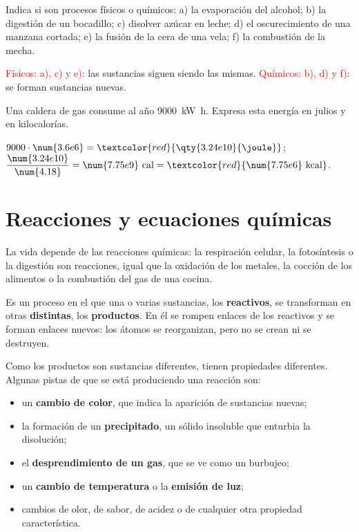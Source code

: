 \begin{exercise}
    Indica si son procesos físicos o químicos: a) la evaporación del alcohol; b) la digestión de un bocadillo; c) disolver azúcar
    en leche; d) el oscurecimiento de una manzana cortada; e) la fusión de la cera de una vela; f) la combustión de la mecha.
    \begin{solu}
        \textcolor{red}{Físicos: a), c) y e)}: las sustancias siguen siendo las mismas. \textcolor{red}{Químicos: b), d) y f)}: se
        forman sustancias nuevas.
    \end{solu}
\end{exercise}

\begin{exercise}
    Una caldera de gas consume al año \qty{9000}{\kilo\watt\hour}. Expresa esta energía en julios y en kilocalorías.
    \begin{solu}
        \(9000 \cdot \num{3.6e6} = \textcolor{red}{\qty{3.24e10}{\joule}}\); \(\dfrac{\num{3.24e10}}{\num{4.18}} = \num{7.75e9}~\mathrm{cal}
        = \textcolor{red}{\num{7.75e6}~\mathrm{kcal}}\).
    \end{solu}
\end{exercise}

\section{Reacciones y ecuaciones químicas}\label{sec:ud6-reacciones}

La vida depende de las reacciones químicas: la respiración celular, la fotosíntesis o la digestión son reacciones, igual que la
oxidación de los metales, la cocción de los alimentos o la combustión del gas de una cocina.

\begin{definition}
    Es un proceso en el que una o varias sustancias, los \textbf{reactivos}, se transforman en otras \textbf{distintas}, los
    \textbf{productos}. En él se rompen enlaces de los reactivos y se forman enlaces nuevos: los átomos se reorganizan, pero no se
    crean ni se destruyen.
\end{definition}

Como los productos son sustancias diferentes, tienen propiedades diferentes. Algunas pistas de que se está produciendo una
reacción son:
\begin{itemize}
    \item un \textbf{cambio de color}, que indica la aparición de sustancias nuevas;
    \item la formación de un \textbf{precipitado}, un sólido insoluble que enturbia la disolución;
    \item el \textbf{desprendimiento de un gas}, que se ve como un burbujeo;
    \item un \textbf{cambio de temperatura} o la \textbf{emisión de luz};
    \item cambios de olor, de sabor, de acidez o de cualquier otra propiedad característica.
\end{itemize}

